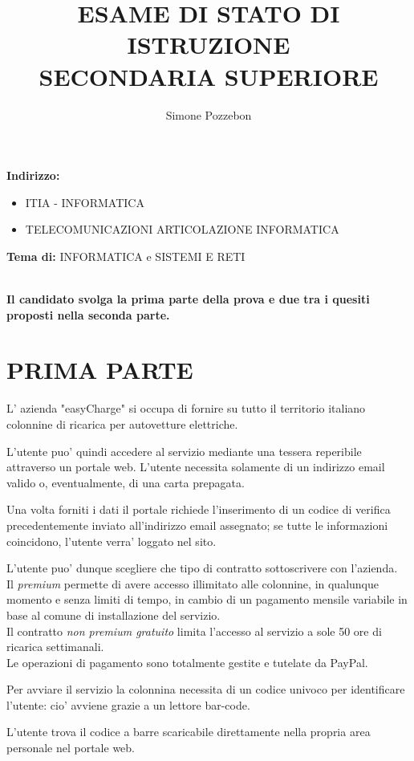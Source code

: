\documentclass[a4paper,12pt]{article}
\author{Simone Pozzebon}
\date{}
\title{ESAME DI STATO DI ISTRUZIONE \\ SECONDARIA SUPERIORE}
\begin{document}
\maketitle
\newpage
\textbf{Indirizzo:}
\begin{itemize}
\item [] ITIA - INFORMATICA 
\item [] TELECOMUNICAZIONI ARTICOLAZIONE INFORMATICA
\end{itemize}

\textbf{Tema di:} INFORMATICA e SISTEMI E RETI \\ \\
\begin{center}
\textbf{Il candidato svolga la prima parte della prova e due tra i quesiti
proposti nella seconda parte.}
\end{center}

\section{\textbf{PRIMA PARTE}}
L' azienda "easyCharge" si occupa di fornire su tutto il territorio italiano
colonnine di ricarica per autovetture elettriche. 

L'utente puo' quindi accedere al servizio mediante una tessera reperibile
attraverso un portale web. L'utente necessita solamente di un indirizzo 
email valido o, eventualmente, di una carta prepagata.

Una volta forniti i dati il portale richiede l'inserimento di un codice di 
verifica precedentemente inviato all'indirizzo email assegnato; se tutte le 
informazioni coincidono, l'utente verra' loggato nel sito. 

L'utente puo' dunque scegliere che tipo di contratto sottoscrivere con l'azienda.\\
Il \textit{premium} permette di avere accesso illimitato alle colonnine,
in qualunque momento e senza limiti di tempo, in cambio di un pagamento
mensile variabile in base al comune di installazione del servizio. \\
Il contratto \textit{non premium gratuito} limita l'accesso al servizio a sole
50 ore di ricarica settimanali. \\
Le operazioni di pagamento sono totalmente gestite e 
tutelate da PayPal.

Per avviare il servizio la colonnina necessita di un codice univoco per 
identificare l'utente: cio' avviene grazie a un lettore bar-code.

L'utente trova il codice a barre scaricabile direttamente nella propria
area personale nel portale web.
\end{document}
